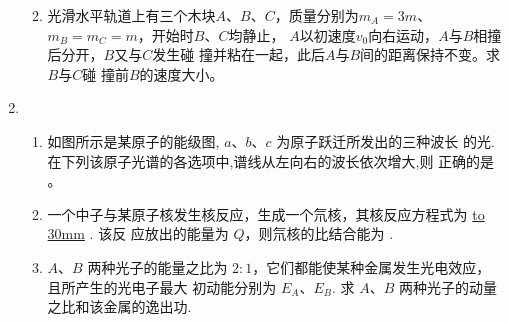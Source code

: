 \begin{enumerate}
\begin{enumerate}

\item 
光滑水平轨道上有三个木块$ A $、$ B $、$ C $，质量分别为$ m_{A} =3  m $、$ m_{B} = m_{C} =m $，开始时$ B $、$ C $均静止，
$ A $以初速度$ v_{0} $向右运动，$ A $与$ B $相撞后分开，$ B $又与$ C $发生碰
撞并粘在一起，此后$ A $与$ B $间的距离保持不变。求$ B $与$ C $碰
撞前$ B $的速度大小。
\begin{figure}[h!]
	\flushright
	
\end{figure}


	
\end{enumerate}



\item 
{}
\begin{enumerate}
	\item
如图所示是某原子的能级图, $ a $、$ b $、$ c $ 为原子跃迁所发出的三种波长
的光. 在下列该原子光谱的各选项中,谱线从左向右的波长依次增大,则
正确的是 \underlinegap 。
\begin{figure}[h!]
	\centering
	
\end{figure}


\pfourchoices
{}
{}
{}
{}





\item 
一个中子与某原子核发生核反应，生成一个氘核，其核反应方程式为 \underline{\hbox to 30mm{}} . 该反
应放出的能量为 $ Q $，则氘核的比结合能为 \underlinegap .


\item 
$ A $、$ B $ 两种光子的能量之比为 $ 2:1 $，它们都能使某种金属发生光电效应，且所产生的光电子最大
初动能分别为 $ E_{A} $、$ E_{B} $. 求 $ A $、$ B $ 两种光子的动量之比和该金属的逸出功.


\end{enumerate}
\end{enumerate}
